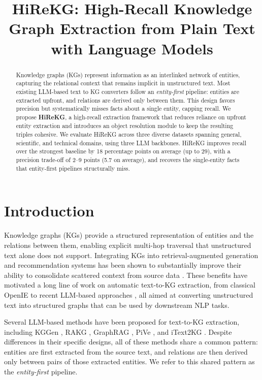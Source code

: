 \documentclass[11pt]{article}
\title{HiReKG: High-Recall Knowledge Graph Extraction from Plain Text with Language Models}
\begin{document}
\maketitle 
\begin{abstract}
    Knowledge graphs (KGs) represent information as an interlinked network of entities, capturing the relational context that remains implicit in unstructured text. Most existing LLM-based text to KG converters follow an \emph{entity-first} pipeline: entities are extracted upfront, and relations are derived only between them. This design favors precision but systematically misses facts about a single entity, capping recall. We propose \textbf{HiReKG}, a high-recall extraction framework that reduces reliance on upfront entity extraction and introduces an object resolution module to keep the resulting triples cohesive. We evaluate HiReKG across three diverse datasets spanning general, scientific, and technical domains, using three LLM backbones. HiReKG improves recall over the strongest baseline by 18 percentage points on average (up to 29), with a precision trade-off of 2--9 points (5.7 on average), and recovers the single-entity facts that entity-first pipelines structurally miss.
\end{abstract}

\section{Introduction}
\label{sec:introduction}

Knowledge graphs (KGs) provide a structured representation of entities and the relations between them, enabling explicit multi-hop traversal that unstructured text alone does not support. Integrating KGs into retrieval-augmented generation and recommendation systems has been shown to substantially improve their ability to consolidate scattered context from source data \citep{llm-kg-emnlp-survey, recommendation_kg, text_summarization_kg}. These benefits have motivated a long line of work on automatic text-to-KG extraction, from classical OpenIE \citep{openie} to recent LLM-based approaches \citep{kg-llm-survey-arxiv}, all aimed at converting unstructured text into structured graphs that can be used by downstream NLP tasks.



Several LLM-based methods have been proposed for text-to-KG extraction, including KGGen \citep{kggen}, RAKG \citep{rakg}, GraphRAG \citep{graphrag_microsoft}, PiVe  \citep{pive}, and iText2KG \citep{itext2kg}. Despite differences in their specific designs, all of these methods share a common pattern: entities are first extracted from the source text, and relations are then derived only between pairs of those extracted entities. We refer to this shared pattern as the \emph{entity-first} pipeline. 
\end{document}
